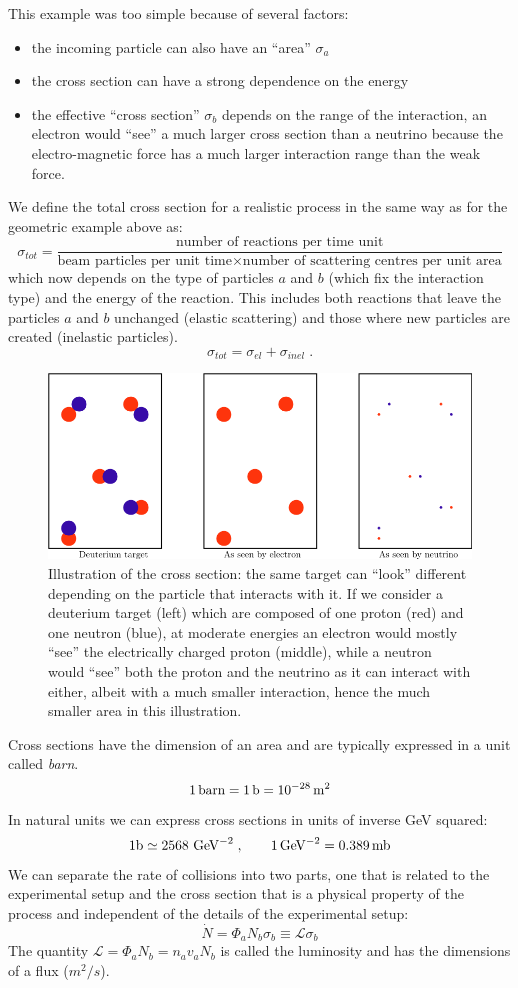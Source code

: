\documentclass[12pt]{article}
\newcommand{\GeV}{\,\rm{GeV}}
\newcommand{\mb}{\, \rm{mb}}
\newcommand{\barn}{\,\rm{b}}
\begin{document}
This example was too simple because of several factors:
\begin{itemize}
\item the incoming particle can also have an ``area'' $\sigma_a$
\item the cross section can have a strong dependence on the energy
\item the effective ``cross section'' $\sigma_b$ depends on the range of the interaction, an electron would ``see'' a much larger cross section than a neutrino because the electro-magnetic force has a much larger interaction range than the weak force.
  \end{itemize}
We define the total cross section for a realistic process in the same way as for the geometric example above as:
\[\sigma_{tot}=\frac{\mbox{number of reactions per time unit}}{\mbox{beam particles per unit time} \times \mbox{number of scattering centres per unit area}}\]
which now depends on the type of particles $a$ and $b$ (which fix the interaction type) and the energy of the reaction. This includes both reactions that leave the particles $a$ and $b$ unchanged (elastic scattering) and those where new particles are created (inelastic particles).
\[\sigma_{tot}=\sigma_{el}+\sigma_{inel}\;.\]
\begin{figure}
\includegraphics[scale=0.5]{images/target.png}
  \caption{Illustration of the cross section: the same target can ``look'' different depending on the particle that interacts with it. If we consider a deuterium target (left) which are composed of one proton (red) and one neutron (blue), at moderate energies an electron would mostly ``see'' the electrically charged proton (middle), while a neutron would ``see'' both the proton and the neutrino as it can interact with either, albeit with a much smaller interaction, hence the much smaller area in this illustration.}\label{fig:xsIllustration}
\end{figure}
Cross sections have the dimension of an area and are typically expressed in a unit called \emph{barn}.
\[1\, \rm{barn}= 1 \barn =10^{-28}\,m^2\]
In natural units we can express cross sections in units of inverse GeV squared:
\[1 \rm{b} \simeq 2568\,\GeV^{-2}\;,\qquad 1\GeV^{-2}=0.389\mb\]
We can separate the rate of collisions into two parts, one that is related to the experimental setup and the cross section that is a physical property of the process and independent of the details of the experimental setup:
\[\dot N = \Phi_a N_b \sigma_b\equiv \mathcal{L}\sigma_b\]
The quantity $\mathcal{L}=\Phi_aN_b=n_a v_a N_b$ is called the luminosity and has the dimensions of a flux ($m^2/s$).
\end{document}
